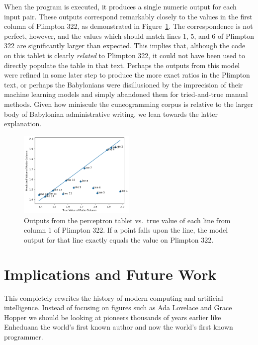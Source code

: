 \documentclass[11pt]{article}
\begin{document}
When the program is executed, it produces a single numeric output for each input pair. 
These outputs correspond remarkably closely to the values in the first column of Plimpton 322, as demonstrated in Figure~\ref{fig:graph}.
The correspondence is not perfect, however, and the values which should match lines 1, 5, and 6 of Plimpton 322 are significantly larger than expected.
This implies that, although the code on this tablet is clearly \textit{related} to Plimpton 322, it could not have been used to directly populate the table in that text.
Perhaps the outputs from this model were refined in some later step to produce the more exact ratios in the Plimpton text, or perhaps the Babylonians were disillusioned by the imprecision of their machine learning models and simply abandoned them for tried-and-true manual methods. 
Given how miniscule the cuneogramming corpus is relative to the larger body of Babylonian administrative writing, we lean towards the latter explanation.

\begin{figure}
    \includegraphics[width=0.5\textwidth]{graph.png}
    \caption{Outputs from the perceptron tablet vs.\ true value of each line from column 1 of Plimpton 322. If a point falls upon the line, the model output for that line exactly equals the value on Plimpton 322.}
    \label{fig:graph}
\end{figure}


\section{Implications and Future Work}
This completely rewrites the history of modern computing and artificial intelligence.
Instead of focusing on figures such as Ada Lovelace and Grace Hopper we should be looking at pioneers thousands of years earlier like Enheduana the world's first known author \cite{Helle2023} and now the world's first known programmer.
\end{document}
